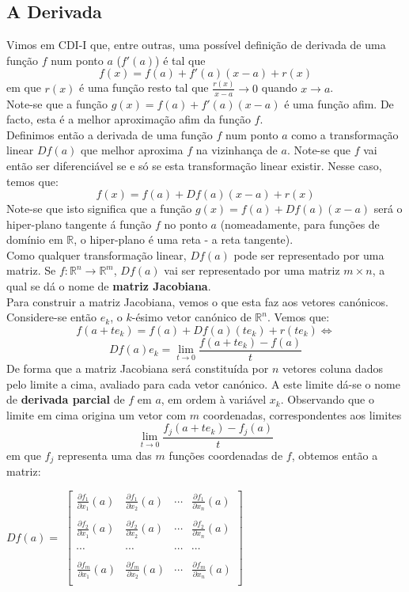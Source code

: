 \documentclass{article}
\newcommand{\R}{\mathbb{R}}
\begin{document}
\subsection{A Derivada}
Vimos em CDI-I que, entre outras, uma possível definição de derivada de uma função $f$ num ponto $a$ ($f'(a)$) é tal que 
$$
f(x) = f(a) + f'(a)(x-a) + r(x)
$$
em que $r(x)$ é uma função resto tal que $\frac{r(x)}{x-a} \to 0$ quando $x \to a$.\\
Note-se que a função $g(x) = f(a) + f'(a)(x-a)$ é uma função afim. De facto, esta é a melhor aproximação afim da função $f$.\\ 
Definimos então a derivada de uma função $f$ num ponto $a$ como a transformação linear $Df(a)$ que melhor aproxima $f$ na vizinhança de $a$. Note-se que $f$ vai então ser diferenciável se e só se esta transformação linear existir. Nesse caso, temos que:
$$
f(x) = f(a) + Df(a)(x-a) + r(x)
$$
Note-se que isto significa que a função $g(x) = f(a) + Df(a)(x-a)$ será o hiper-plano tangente á função $f$ no ponto $a$ (nomeadamente, para funções de domínio em $\R$, o hiper-plano é uma reta - a reta tangente).\\
Como qualquer transformação linear, $Df(a)$ pode ser representado por uma matriz. Se $f: \R^n \to \R^m$, $Df(a)$ vai ser representado por uma matriz $m \times n$, a qual se dá o nome de \textbf{matriz Jacobiana}.\\
Para construir a matriz Jacobiana, vemos o que esta faz aos vetores canónicos. Considere-se então $e_k$, o $k$-ésimo vetor canónico de $\R^n$. Vemos que:
$$
f(a + te_k) = f(a) + Df(a)(te_k) + r(te_k) \Leftrightarrow
$$
$$
Df(a)e_k = \lim_{t \to 0} \frac{f(a + te_k)-f(a)}{t}
$$
De forma que a matriz Jacobiana será constituída por $n$ vetores coluna dados pelo limite a cima, avaliado para cada vetor canónico. A este limite dá-se o nome de \textbf{derivada parcial} de $f$ em $a$, em ordem à variável $x_k$. Observando que o limite em cima origina um vetor com $m$ coordenadas, correspondentes aos limites
$$
\lim_{t \to 0} \frac{f_j(a + te_k)-f_j(a)}{t}
$$
em que $f_j$ representa uma das $m$ funções coordenadas de $f$, obtemos então a matriz:\\
\begin{center}
$Df(a) = $
$\begin{bmatrix}
	\frac{\partial f_1}{\partial x_1}(a) & \frac{\partial f_1}{\partial x_2}(a) & \cdots & 	\frac{\partial f_1}{\partial x_n}(a) \\
	\\
	\frac{\partial f_2}{\partial x_1}(a) & \frac{\partial f_2}{\partial x_2}(a) & \cdots & 	\frac{\partial f_2}{\partial x_n}(a) \\
	\\
	\cdots & \cdots & \cdots & \cdots \\
	\\
	\frac{\partial f_m}{\partial x_1}(a) & \frac{\partial f_m}{\partial x_2}(a) & \cdots & 	\frac{\partial f_m}{\partial x_n}(a) \\
\end{bmatrix}$
\end{center}
\end{document}
